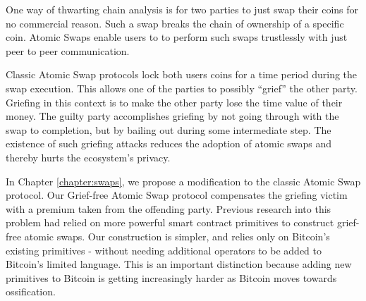 

One way of thwarting chain analysis is for two parties to just swap their coins for no commercial reason. Such a swap breaks the chain of ownership of a specific coin. Atomic Swaps enable users to to perform such swaps trustlessly with just peer to peer communication.

Classic Atomic Swap protocols lock both users coins for a time period during the swap execution. This allows one of the parties to possibly ``grief'' the other party. Griefing in this context is to make the other party lose the time value of their money. The guilty party accomplishes griefing by not going through with the swap to completion, but by bailing out during some intermediate step. The existence of such griefing attacks reduces the adoption of atomic swaps and thereby hurts the ecosystem's privacy.

In Chapter \ref{chapter:swaps}, we propose a modification to the classic Atomic Swap protocol. Our Grief-free Atomic Swap protocol compensates the griefing victim with a premium taken from the offending party. Previous research into this problem had relied on more powerful smart contract primitives to construct grief-free atomic swaps. Our construction is simpler, and relies only on Bitcoin's existing primitives - without needing additional operators to be added to Bitcoin's limited language. This is an important distinction because adding new primitives to Bitcoin is getting increasingly harder as Bitcoin moves towards ossification. 

